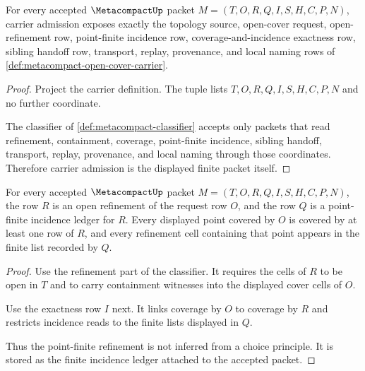 \begin{theorem}
\label{thm:metacompact-carrier-admission}
For every accepted $\MetacompactUp$ packet $M=(T,O,R,Q,I,S,H,C,P,N)$, carrier admission exposes exactly the topology source, open-cover request, open-refinement row, point-finite incidence row, coverage-and-incidence exactness row, sibling handoff row, transport, replay, provenance, and local naming rows of \autoref{def:metacompact-open-cover-carrier}.
\end{theorem}
\begin{proof}
Project the carrier definition. The tuple lists $T,O,R,Q,I,S,H,C,P,N$ and no further coordinate.

The classifier of \autoref{def:metacompact-classifier} accepts only packets that read refinement, containment, coverage, point-finite incidence, sibling handoff, transport, replay, provenance, and local naming through those coordinates. Therefore carrier admission is the displayed finite packet itself.
\end{proof}

\begin{theorem}
\label{thm:metacompact-point-finite-refinement-exactness}
For every accepted $\MetacompactUp$ packet $M=(T,O,R,Q,I,S,H,C,P,N)$, the row $R$ is an open refinement of the request row $O$, and the row $Q$ is a point-finite incidence ledger for $R$. Every displayed point covered by $O$ is covered by at least one row of $R$, and every refinement cell containing that point appears in the finite list recorded by $Q$.
\end{theorem}
\begin{proof}
Use the refinement part of the classifier. It requires the cells of $R$ to be open in $T$ and to carry containment witnesses into the displayed cover cells of $O$.

Use the exactness row $I$ next. It links coverage by $O$ to coverage by $R$ and restricts incidence reads to the finite lists displayed in $Q$.

Thus the point-finite refinement is not inferred from a choice principle. It is stored as the finite incidence ledger attached to the accepted packet.
\end{proof}

